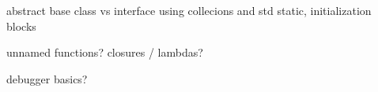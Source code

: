 \documentclass[../../main.tex]{subfiles}
\begin{document}
abstract base class vs interface
using collecions and std
static, initialization blocks

unnamed functions? closures / lambdas?

debugger basics?
\end{document}
